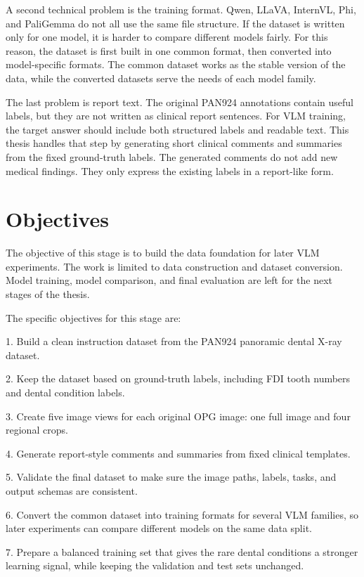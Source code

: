 \documentclass[a4paper,12pt]{report}
\begin{document}
A second technical problem is the training format. Qwen, LLaVA, InternVL, Phi, and PaliGemma do not all use the same file structure. If the dataset is written only for one model, it is harder to compare different models fairly. For this reason, the dataset is first built in one common format, then converted into model-specific formats. The common dataset works as the stable version of the data, while the converted datasets serve the needs of each model family.

The last problem is report text. The original PAN924 annotations contain useful labels, but they are not written as clinical report sentences. For VLM training, the target answer should include both structured labels and readable text. This thesis handles that step by generating short clinical comments and summaries from the fixed ground-truth labels. The generated comments do not add new medical findings. They only express the existing labels in a report-like form.


\section{Objectives}
The objective of this stage is to build the data foundation for later VLM experiments. The work is limited to data construction and dataset conversion. Model training, model comparison, and final evaluation are left for the next stages of the thesis.

The specific objectives for this stage are:

1. Build a clean instruction dataset from the PAN924 panoramic dental X-ray dataset.
 
2. Keep the dataset based on ground-truth labels, including FDI tooth numbers and dental condition labels.

3. Create five image views for each original OPG image: one full image and four regional crops.

4. Generate report-style comments and summaries from fixed clinical templates.

5. Validate the final dataset to make sure the image paths, labels, tasks, and output schemas are consistent.
 
6. Convert the common dataset into training formats for several VLM families, so later experiments can compare different models on the same data split.

7. Prepare a balanced training set that gives the rare dental conditions a stronger learning signal, while keeping the validation and test sets unchanged.
\end{document}
